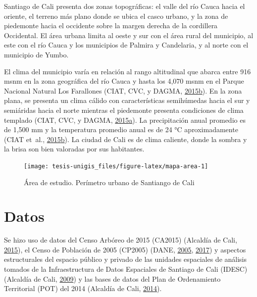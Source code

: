 \documentclass[12pt,a4paper,oneside, openany]{book}
\theoremstyle{definition}
\theoremstyle{definition}
\theoremstyle{definition}
\theoremstyle{remark}
\begin{document}
Santiago de Cali presenta dos zonas topográficas: el valle del río Cauca
hacia el oriente, el terreno más plano donde se ubica el casco urbano, y
la zona de piedemonte hacia el occidente sobre la margen derecha de la
cordillera Occidental. El área urbana limita al oeste y sur con el área
rural del municipio, al este con el río Cauca y los municipios de
Palmira y Candelaria, y al norte con el municipio de Yumbo.

El clima del municipio varía en relación al rango altitudinal que abarca
entre 916 msnm en la zona geográfica del río Cauca y hasta los 4,070
msnm en el Parque Nacional Natural Los Farallones (CIAT, CVC, y DAGMA,
\protect\hyperlink{ref-ciat_plan_2015}{2015}\protect\hyperlink{ref-ciat_plan_2015}{b}).
En la zona plana, se presenta un clima cálido con características
semihúmedas hacia el sur y semiáridas hacia el norte mientras el
piedemonte presenta condiciones de clima templado (CIAT, CVC, y DAGMA,
\protect\hyperlink{ref-ciat_microzona_2015}{2015}\protect\hyperlink{ref-ciat_microzona_2015}{a}).
La precipitación anual promedio es de 1,500 mm y la temperatura promedio
anual es de 24 °C aproximadamente (CIAT et~al.,
\protect\hyperlink{ref-ciat_plan_2015}{2015}\protect\hyperlink{ref-ciat_plan_2015}{b}).
La ciudad de Cali es de clima caliente, donde la sombra y la brisa son
bien valoradas por sus habitantes.

\begin{figure}[H]

{\centering \texttt{[image: tesis-unigis\_files/figure-latex/mapa-area-1]} 

}

\caption{Área de estudio. Perímetro urbano de Santiango de Cali}\label{fig:mapa-area}
\end{figure}

\section{Datos}\label{datos}

Se hizo uso de datos del Censo Arbóreo de 2015 (CA2015) (Alcaldía de
Cali, \protect\hyperlink{ref-ca2015cali}{2015}), el Censo de Población
de 2005 (CP2005) (DANE,
\protect\hyperlink{ref-censo_sistema_dane}{2005},
\protect\hyperlink{ref-geoportal_DANE}{2017}) y aspectos estructurales
del espacio público y privado de las unidades espaciales de análisis
tomados de la Infraestructura de Datos Espaciales de Santiago de Cali
(IDESC) (Alcaldía de Cali,
\protect\hyperlink{ref-geoportal_idesc}{2009}) y las bases de datos del
Plan de Ordenamiento Territorial (POT) del 2014 (Alcaldía de Cali,
\protect\hyperlink{ref-pot2014cali}{2014}).
\end{document}
